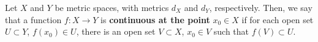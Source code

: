 \begin{definition}
    Let $X$ and $Y$ be metric spaces, with metrics
    $d_X$ and $d_Y$, respectively. Then, we say that
    a function $f:X\to Y$ is
    \textbf{continuous at the point} $x_0 \in X$
    if for each open set $U\subset Y$, $f(x_0)\in U$,
    there is an open set $V\subset X$,
    $x_0\in V$ such that $f(V)\subset U.$
\end{definition}